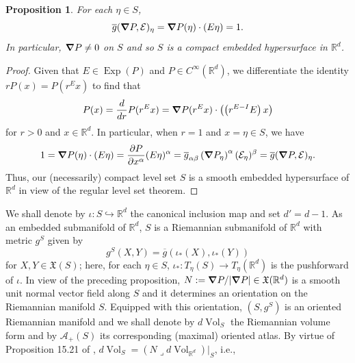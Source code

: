 \documentclass[11pt, letter]{book}
\newtheorem{proposition}[theorem]{Proposition}
\newcommand\Exp{\operatorname{Exp}}
\newcommand{\Vol}{\operatorname{Vol}}
\newcommand{\iprod}{\mathbin{\lrcorner}}
\begin{document}
\begin{framed}
\begin{proposition}\label{prop:InnerProdIsOne}
For each $\eta\in S$, 
\begin{equation*}
    \overline{g}(\grad P,\mathcal{E})_{\eta}=\grad P(\eta)\cdot (E\eta)=1.
\end{equation*}
In particular, $\grad P \neq 0$ on $S$ and so $S$ is a compact embedded hypersurface in $\mathbb{R}^d$.
\end{proposition}
\end{framed}
\begin{proof}
Given that $E\in\Exp(P)$ and $P\in C^\infty(\mathbb{R}^d)$, we differentiate the identity $rP(x)=P(r^Ex)$ to find that
\begin{equation*}
    P(x)=\frac{d}{dr}P(r^Ex)=\grad P(r^Ex)\cdot\left(\left(r^{E-I}E\right)x\right)
\end{equation*}
for $r>0$ and $x\in\mathbb{R}^d$. In particular, when $r=1$ and $x=\eta\in S$, we have
\begin{equation*}
    1=\grad P(\eta)\cdot \left(E\eta\right)=\frac{\partial P}{\partial x^\alpha}(E\eta)^\alpha=\overline{g}_{\alpha \beta}\left(\grad P_\eta\right)^{\alpha}(\mathcal{E}_\eta)^\beta=\overline{g}(\grad P,\mathcal{E})_\eta.
\end{equation*}
Thus, our (necessarily) compact level set $S$ is a smooth embedded hypersurface of $\mathbb{R}^d$ in view of the regular level set theorem.
\end{proof}
\noindent We shall denote by $\iota:  S \hookrightarrow \mathbb{R}^d$ the canonical inclusion map and set $d'=d-1$. As an embedded submanifold of $\mathbb{R}^d$, $S$ is a Riemannian submanifold of $\mathbb{R}^d$ with metric $g^S$ given by
\begin{equation*}
    g^S(X,Y)=\overline{g}(\iota_*(X),\iota_*(Y))
\end{equation*}
for $X,Y\in\mathfrak{X}(S)$; here, for each $\eta\in S$,  $\iota_*:T_\eta(S)\to T_\eta(\mathbb{R}^d)$ is the pushforward of $\iota$.  In view of the preceding proposition, $N:=\grad P/|\grad P|\in \mathfrak{X}(\mathbb{R}^d)$ is a smooth unit normal vector field along $S$ and it determines an orientation on the Riemannian manifold $S$. Equipped with this orientation, $(S,g^S)$ is an oriented Riemannian manifold and we shall denote by $d\Vol_S$ the Riemannian volume form and by $\mathcal{A}_+(S)$ its corresponding (maximal) oriented atlas. By virtue of Proposition 15.21 of \cite{lee_introduction_2003}, $d\Vol_S=(N\iprod d\Vol_{\mathbb{R}^d})\vert_S$, i.e.,
\end{document}
